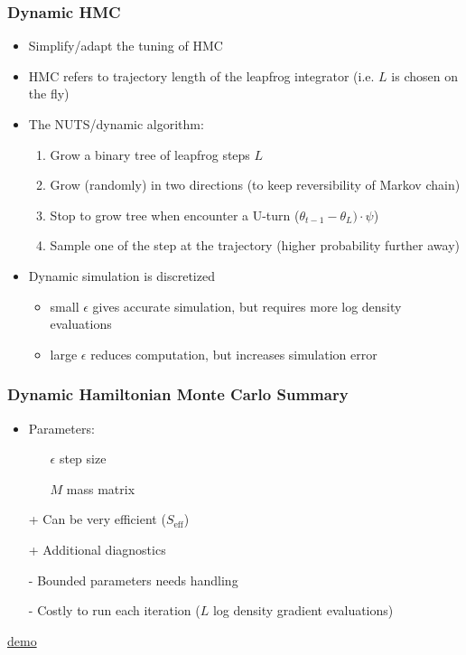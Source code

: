 \documentclass[10pt]{beamer}
\begin{document}
\begin{frame}
\frametitle{Dynamic HMC}

  \begin{itemize}
  \item {} Simplify/adapt the tuning of HMC
  \item {} HMC refers to  trajectory length of the leapfrog integrator (i.e. $L$ is chosen on the fly) \pause
  \item The NUTS/dynamic algorithm:
  \begin{enumerate}
    \item Grow a binary tree of leapfrog steps $L$
    \item Grow (randomly) in two directions (to keep reversibility of Markov chain)
    \item Stop to grow tree when encounter a U-turn ($\theta_{t-1}-\theta_L)\cdot\psi$)
    \item Sample one of the step at the trajectory (higher probability further away)
  \end{enumerate}
  \pause
  \item Dynamic simulation is discretized
  \begin{itemize}
    \item small $\epsilon$ gives accurate simulation, but requires more log density evaluations
    \item large $\epsilon$ reduces computation, but increases
      simulation error
    \end{itemize}
\end{itemize}

\end{frame}

\begin{frame}
\frametitle{Dynamic Hamiltonian Monte Carlo Summary}

\begin{itemize}
\item Parameters:
\begin{itemize}
\item[$\epsilon$] step size \pause
\item[$M$] mass matrix\pause
\end{itemize}
\item[+] Can be very efficient ($S_\text{eff}$)
\item[+] Additional diagnostics
\pause
\item[-] Bounded parameters needs handling
\item[-] Costly to run each iteration ($L$ log density gradient evaluations)
\pause
\end{itemize}

\centering
\href{https://chi-feng.github.io/mcmc-demo/app.html?algorithm=EfficientNUTS&target=standard}{demo}

\end{frame}
\end{document}
